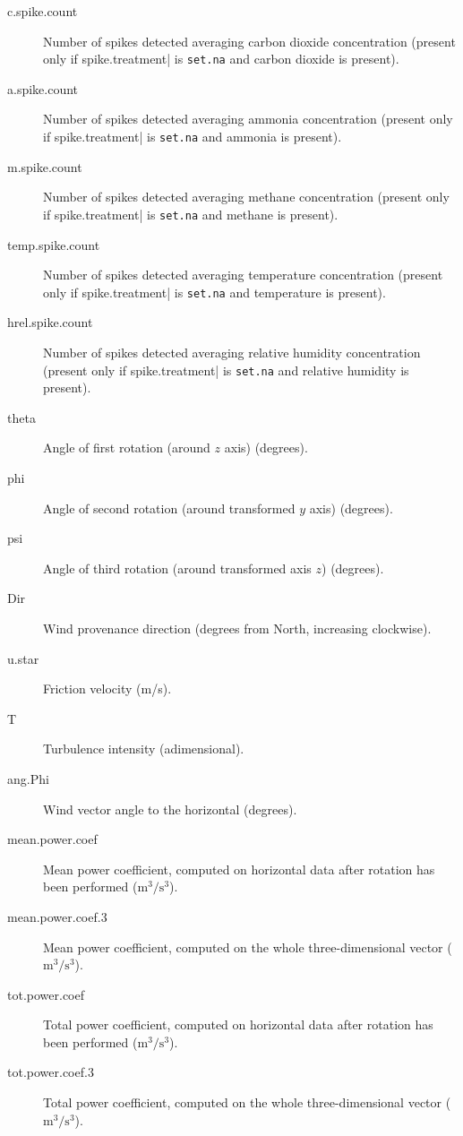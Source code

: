\documentclass[a4paper,10pt]{book}
\begin{document}
\begin{description}
 \item[c.spike.count] Number of spikes detected averaging carbon dioxide concentration (present only if \verb||spike.treatment| is \verb|set.na| and carbon dioxide is present).
 \item[a.spike.count] Number of spikes detected averaging ammonia concentration (present only if \verb||spike.treatment| is \verb|set.na| and ammonia is present).
 \item[m.spike.count] Number of spikes detected averaging methane concentration (present only if \verb||spike.treatment| is \verb|set.na| and methane is present).
 \item[temp.spike.count] Number of spikes detected averaging temperature concentration (present only if \verb||spike.treatment| is \verb|set.na| and temperature is present).
 \item[hrel.spike.count] Number of spikes detected averaging relative humidity concentration (present only if \verb||spike.treatment| is \verb|set.na| and relative humidity is present).
 \item[theta] Angle of first rotation (around $z$ axis) (degrees).
 \item[phi] Angle of second rotation (around transformed $y$ axis) (degrees).
 \item[psi] Angle of third rotation (around transformed axis $z$) (degrees).
 \item[Dir] Wind provenance direction (degrees from North, increasing clockwise).
 \item[u.star] Friction velocity (m/s).
 \item[T] Turbulence intensity (adimensional).
 \item[ang.Phi] Wind vector angle to the horizontal (degrees).
 \item[mean.power.coef] Mean power coefficient, computed on horizontal data after rotation has been performed ($\mbox{m}^{3}/\mbox{s}^{3}$).
 \item[mean.power.coef.3] Mean power coefficient, computed on the whole three-dimensional vector ($\mbox{m}^{3}/\mbox{s}^{3}$).
 \item[tot.power.coef] Total power coefficient, computed on horizontal data after rotation has been performed ($\mbox{m}^{3}/\mbox{s}^{3}$).
 \item[tot.power.coef.3] Total power coefficient, computed on the whole three-dimensional vector ($\mbox{m}^{3}/\mbox{s}^{3}$).
\end{description}


\end{document}
